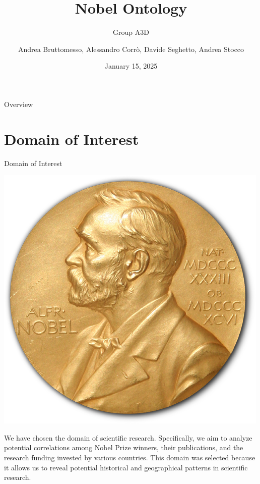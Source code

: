 \documentclass[aspectratio=169,xcolor=dvipsnames]{beamer}
\title{Nobel Ontology}
\subtitle{Group A3D}
\author{Andrea Bruttomesso, Alessandro Corr\`o, Davide Seghetto, Andrea Stocco}
\date{January 15, 2025} %
\begin{document}
\begin{frame}
	\titlepage
\end{frame}

\begin{frame}{Overview}
	\tableofcontents
\end{frame}

\section{Domain of Interest}

\begin{frame}{Domain of Interest}
	\centering
	\begin{minipage}{0.3\textwidth}
		\centering
		\includegraphics[width=\textwidth]{nobel.png} %
	\end{minipage}%
	\hspace{3em}
	\begin{minipage}{0.4\textwidth}
		\centering
		We have chosen the domain of scientific research. Specifically, we aim to analyze potential correlations among Nobel Prize winners,
		their publications, and the research funding invested by various countries. This domain was selected because it allows us to reveal potential historical
		and geographical patterns in scientific research.
	\end{minipage}%
\end{frame}
\end{document}
